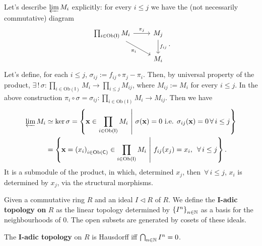 \begin{ex}
	Let's describe $\varprojlim M_i$ explicitly: for every $i \leq j$ we have the (not necessarily commutative) diagram
	\begin{equation}
	\begin{tikzcd}
		\prod_{i \in \mathrm{Ob} \left(\mathsf{I}\right)} M_i \arrow[r, "\pi_j", rightarrow] \arrow[rd, "\pi_i"', rightarrow] &
		M_j \arrow[d, "f_{ij}", rightarrow] \\
		& M_i
	\end{tikzcd} 
	.\end{equation}
	Let's define, for each $i \leq j$, $\sigma_{ij} := f_{ij} \circ\pi_j - \pi_i$.
	Then, by universal property of the product,
	$\exists\, !\, \sigma: \prod_{i \in \mathrm{Ob} \left(\mathsf{I}\right)} M_i \to \prod_{i \leq j} M_{ij}$,
	where $M_{ij} := M_i$ for every $i \leq j$.
	In the above construction $\pi_i \circ\sigma = \sigma_{ij}: \prod_{i \in \mathrm{Ob} \left(\mathsf{I}\right)} M_i \to M_{ij}$.
	Then we have
	\begin{align}
		\varprojlim M_i &\simeq \ker \sigma =
		\left\{ \mathbf{x} \in \prod_{i \in \mathrm{Ob} \left(\mathsf{I}\right)}
			M_i \ \middle|\ \sigma(\mathbf{x}) = 0
		\text{ i.e. } \sigma_{ij}(\mathbf{x}) =0 \,\forall\, i \leq j \right\} \\
				&=
		\left\{ \mathbf{x} = \left( x_i \right)_{i \in \mathrm{Ob} \left(\mathsf{C}\right)} \in
		\prod_{i \in \mathrm{Ob} \left(\mathsf{I}\right)} M_i \ \middle|\ 
		f_{ij}(x_j) = x_i, \ \,\forall\, i \leq j \right\}
	.\end{align} 
	It is a submodule of the product, in which, determined $x_j$, then $\,\forall\, i \leq j$, $x_i$ is determined by $x_j$, via the structural morphisms.
\end{ex} 

\begin{defn}
	Given a commutative ring $R$ and an ideal $I \triangleleft R$ of $R$.
	We define the \textbf{$\mathbf{I}$-adic topology on} $R$ as the linear topology determined by
	$\left\{ I^n \right\}_{n \in \mathbb{N}}$ as a basis for the neighbourhoods of $0$.
	The open subsets are generated by cosets of these ideals.
\end{defn}

\begin{rem}
	The \textbf{$\mathbf{I}$-adic topology} on $R$ is Hausdorff iff $\bigcap_{n \in \mathbb{N}} I^n = 0$.
\end{rem} 

